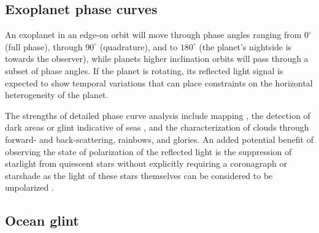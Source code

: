 \documentclass[
    usenatbib,
]{mnras}
\begin{document}

\subsection{Exoplanet phase curves}

An exoplanet in an edge-on orbit will move through phase angles ranging from $0^\circ$ (full phase), through $90^\circ$ (quadrature), and to $180^\circ$ (the planet's nightside is towards the observer), while planets higher inclination orbits will pass through a subset of phase angles.
%
If the planet is rotating, its reflected light signal is expected to show temporal variations that can place constraints on the horizontal heterogeneity of the planet.

The strengths of detailed phase curve analysis include mapping \citep{2001Natur.412..885F, berdyugina2019surface, 2022A&A...664A..59M}, the detection of dark areas or glint indicative of seas \citep{groot2020, cowan2008inverting, lustig2019}, and the characterization of clouds through forward- and back-scattering, rainbows, and glories.
%
An added potential benefit of observing the state of polarization of the reflected light is the suppression of starlight from quiescent stars without explicitly requiring a coronagraph or starshade as the light of these stars themselves can be considered to be unpolarized \citep{kemp1987}.


\subsection{Ocean glint}
\end{document}

